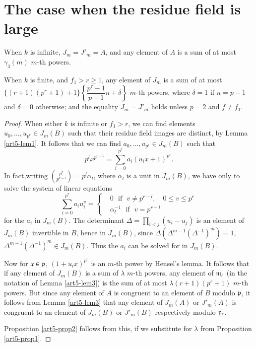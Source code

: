\section{The case when the residue field is large}\label{art5-sec2}

\begin{prop}\label{art5-prop2}
When $k$ is infinite, $J_m = J'_m = A$, and any element of $A$ is a sum of at most $\gamma_3 (m)$ $m$-th powers.

When $k$ is finite, and $f_1 > r \geq 1$, any element of $J_m$ is a sum of at most $\{(r+1) (p^r+1) +1\} \left\{\dfrac{p^\tau -1}{p-1}  n + \delta\right\}$ $m$-th powers, where $\delta =1$ if $n=p-1$ and $\delta =0$ otherwise; and the equality $J_m = J'_m$ holds unless $p=2$ and $f \neq f_1$.
\end{prop}

\begin{proof}
When either $k$ is infinite or $f_1 > r$, we can find elements\break $u_0, \ldots, u_{p^r} \in J_m (B)$ such that their residue field images are distinct, by Lemma \ref{art5-lem1}. It follows that we can find $a_0, \ldots, a_{p^r} \in J_m (B)$ such that 
\begin{equation}
p^l x^{p^{r-1}} = \sum\limits^{p^r}_{i=0} a_i (u_i x + 1)^{p^r}. \label{art5-eq2}
\end{equation}
In fact,\pageoriginale writing $\binom{p^r}{p^{r-l}} = p^l \alpha_l$, where $\alpha_l$ is a unit in $J_m(B)$, we have only to solve the system of linear equations
\begin{equation*}
\sum\limits^{p^r}_{i=0} a_i u_i^v = 
\left\{
\begin{aligned}
& 0 \text{~ if ~} v \neq p^{r-l}, \quad 0 \leq v \leq p^r\\
& \alpha^{-1}_{l} \text{~ if ~}  v = p^{r-l} 
\end{aligned}
\right.
\end{equation*}
for the $a_i$ in $J_m(B)$. The determinant $\Delta = \prod\limits_{i < j} (u_i - u_j)$ is an element of $J_m(B)$ invertible in $B$, hence in $J_m(B)$, since $\Delta (\Delta^{m-1} (\Delta^{-1})^m) =1$, $\Delta^{m-1} (\Delta^{-1})^m \in J_m (B)$. Thus the $a_i$ can be solved for in $J_m (B)$.

Now for $x \in \mathfrak{p}$, $(1 + u_i x)^{p^r}$ is an $m$-th power by Hensel's lemma. It follows that if any element of $J_m (B)$ is a sum of $\lambda$ $m$-th powers, any element of $\mathfrak{m}_r$ (in the notation of Lemma \ref{art5-lem3}) is the sum of at most $\lambda (r+1) (p^r +1)$ $m$-th powers. But since any element of $A$ is congruent to an element of $B$ modulo $\mathfrak{p}$, it follows from Lemma \ref{art5-lem3} that any element of $J_m (A)$ or $J'_m(A)$ is congruent to an element of $J_m(B)$ or $J'_m(B)$ respectively modulo $\mathfrak{p}_r$.

Proposition \ref{art5-prop2} follows from this, if we substitute for $\lambda$ from Proposition \ref{art5-prop1}. 
\end{proof}

